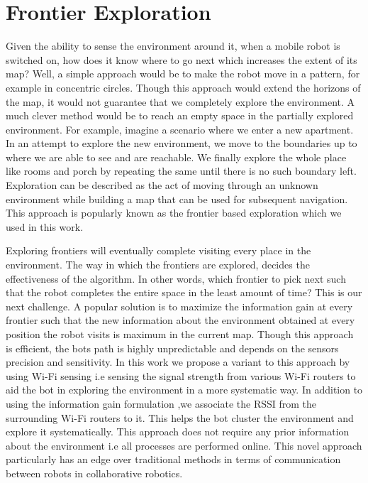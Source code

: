 \section{Frontier Exploration}
Given the ability to sense the environment around it, when a mobile robot is switched on, how does it know where to go next which increases the extent of its map? Well, a simple approach would be to make the robot move in a pattern, for example in concentric circles\cite{9}. Though this approach would extend the horizons of the map, it would not guarantee that we completely explore the environment. A much clever method would be to reach an empty space in the partially explored environment. For example, imagine a scenario where we enter a new apartment. In an attempt to explore the new environment, we move to the boundaries up to where we are able to see and are reachable. We finally explore the whole place like rooms and porch by repeating the same until there is no such boundary left.  Exploration can be described as the act of moving through an unknown environment while building a map that can be used for subsequent navigation\cite{10}. This approach is popularly known as the frontier based exploration which we used in this work.

\par Exploring frontiers will eventually complete visiting every place in the environment. The way in which the frontiers are explored, decides the effectiveness of the algorithm. In other words, which frontier to pick next such that the robot completes the entire space in the least amount of time? This is our next challenge. A popular solution is to maximize the information gain at every frontier such that the new information about the environment obtained at every position the robot visits is maximum in the current map. Though this approach is efficient, the bots path is highly unpredictable and depends on the sensors precision and sensitivity. In this work we propose a variant to this approach by using Wi-Fi sensing i.e sensing the signal strength from various Wi-Fi routers to aid the bot in exploring the environment in a more systematic way. In addition to using the information gain formulation ,we associate the RSSI from the surrounding Wi-Fi routers to it. This helps the bot cluster the environment and explore it systematically. This approach does not require any prior information about the environment i.e all processes are performed online. This novel approach particularly has an edge over traditional methods in terms of communication between robots in collaborative robotics.

